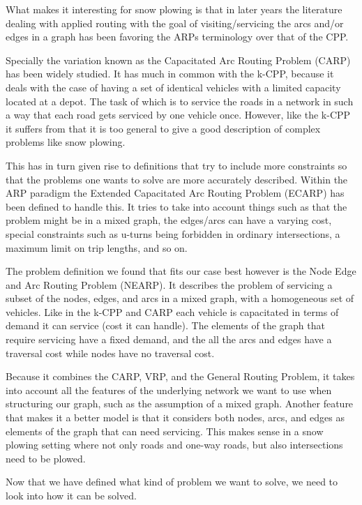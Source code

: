 What makes it interesting for snow plowing is that in later years the literature dealing with applied routing with the goal of visiting/servicing the arcs and/or edges in a graph has been favoring the ARPs terminology over that of the CPP.

Specially the variation known as the Capacitated Arc Routing Problem (CARP) has been widely studied. It has much in common with the k-CPP, because it deals with the case of having a set of identical vehicles with a limited capacity located at a depot. The task of which is to service the roads in a network in such a way that each road gets serviced by one vehicle once. However, like the k-CPP it suffers from that it is too general to give a good description of complex problems like snow plowing.

This has in turn given rise to definitions that try to include more constraints so that the problems one wants to solve are more accurately described. Within the ARP paradigm the Extended Capacitated Arc Routing Problem (ECARP) has been defined to handle this. It tries to take into account things such as that the problem might be in a mixed graph, the edges/arcs can have a varying cost, special constraints such as u-turns being forbidden in ordinary intersections, a maximum limit on trip lengths, and so on.

The problem definition we found that fits our case best however is the Node Edge and Arc Routing Problem (NEARP). It describes the problem of servicing a subset of the nodes, edges, and arcs in a mixed graph, with a homogeneous set of vehicles. Like in the k-CPP and CARP each vehicle is capacitated in terms of demand it can service (cost it can handle). The elements of the graph that require servicing have a fixed demand, and the all the arcs and edges have a traversal cost while nodes have no traversal cost.

Because it combines the CARP, VRP, and the General Routing Problem, it takes into account all the features of the underlying network we want to use when structuring our graph, such as the assumption of a mixed graph. Another feature that makes it a better model is that it considers both nodes, arcs, and edges as elements of the graph that can need servicing. This makes sense in a snow plowing setting where not only roads and one-way roads, but also intersections need to be plowed.

Now that we have defined what kind of problem we want to solve, we need to look into how it can be solved.


